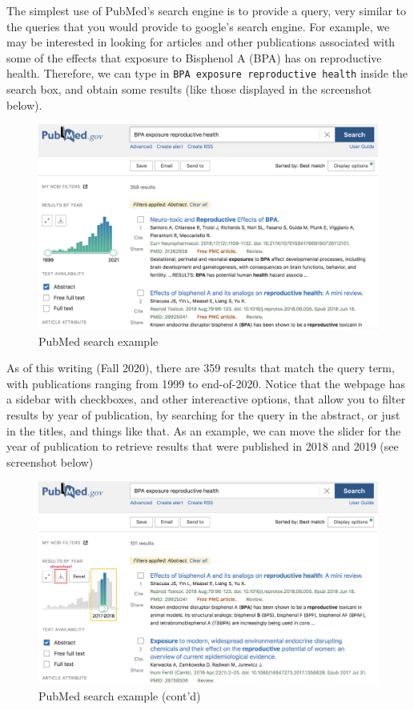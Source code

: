 \documentclass[
]{book}
\begin{document}
The simplest use of PubMed's search engine is to provide a query, very similar
to the queries that you would provide to google's search engine. For example,
we may be interested in looking for articles and other publications associated
with some of the effects that exposure to Bisphenol A (BPA) has on reproductive
health. Therefore, we can type in \texttt{BPA\ exposure\ reproductive\ health} inside the
search box, and obtain some results (like those displayed in the screenshot
below).

\begin{figure}

{\centering \includegraphics[width=0.7\linewidth]{images/api/pubmed-search1} 

}

\caption{PubMed search example}\label{fig:unnamed-chunk-144}
\end{figure}

As of this writing (Fall 2020), there are 359 results that match the query
term, with publications ranging from 1999 to end-of-2020. Notice that the
webpage has a sidebar with checkboxes, and other intereactive options, that
allow you to filter results by year of publication, by searching for the query
in the abstract, or just in the titles, and things like that. As an example,
we can move the slider for the year of publication to retrieve results that
were published in 2018 and 2019 (see screenshot below)

\begin{figure}

{\centering \includegraphics[width=0.7\linewidth]{images/api/pubmed-search2} 

}

\caption{PubMed search example (cont'd)}\label{fig:unnamed-chunk-145}
\end{figure}
\end{document}
